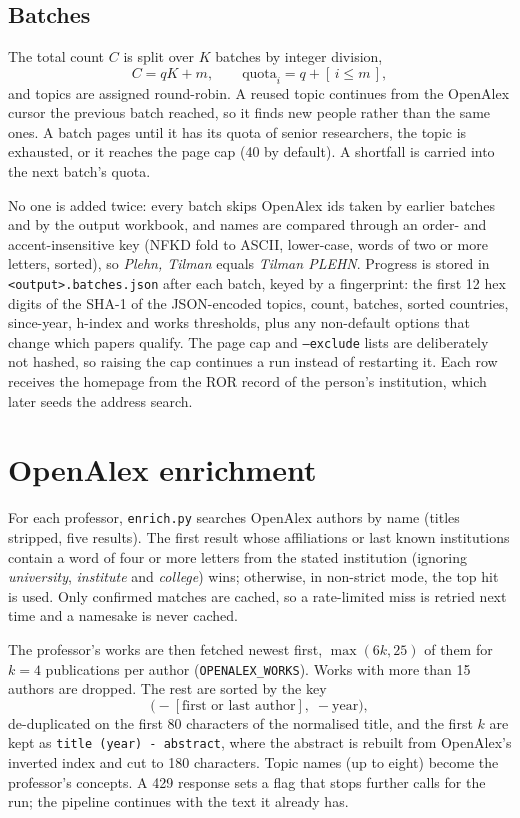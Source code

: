\documentclass[11pt,a4paper]{article}
\newcommand{\code}[1]{\texttt{#1}}
\begin{document}
\subsection{Batches}\label{sec:batches}
The total count $C$ is split over $K$ batches by integer division,
\[
  C = qK + m, \qquad \text{quota}_i = q + [\,i \le m\,] ,
\]
and topics are assigned round-robin. A reused topic continues from the OpenAlex cursor the
previous batch reached, so it finds new people rather than the same ones. A batch pages until it
has its quota of senior researchers, the topic is exhausted, or it reaches the page cap (40 by
default). A shortfall is carried into the next batch's quota.

No one is added twice: every batch skips OpenAlex ids taken by earlier batches and by the output
workbook, and names are compared through an order- and accent-insensitive key (NFKD fold to
ASCII, lower-case, words of two or more letters, sorted), so \emph{Plehn, Tilman} equals
\emph{Tilman PLEHN}. Progress is stored in \code{<output>.batches.json} after each batch, keyed by
a fingerprint: the first 12 hex digits of the SHA-1 of the JSON-encoded topics, count, batches,
sorted countries, since-year, h-index and works thresholds, plus any non-default options that
change which papers qualify. The page cap and \code{--exclude} lists are deliberately not
hashed, so raising the cap continues a run instead of restarting it. Each row receives the
homepage from the ROR record of the person's institution, which later seeds the address search.

\section{OpenAlex enrichment}

For each professor, \code{enrich.py} searches OpenAlex authors by name (titles stripped, five
results). The first result whose affiliations or last known institutions contain a word of four
or more letters from the stated institution (ignoring \emph{university}, \emph{institute} and
\emph{college}) wins; otherwise, in non-strict mode, the top hit is used. Only confirmed matches
are cached, so a rate-limited miss is retried next time and a namesake is never cached.

The professor's works are then fetched newest first, $\max(6k, 25)$ of them for $k = 4$
publications per author (\code{OPENALEX\_WORKS}). Works with more than 15 authors are dropped.
The rest are sorted by the key
\[
  \bigl(-[\text{first or last author}],\; -\text{year}\bigr),
\]
de-duplicated on the first 80 characters of the normalised title, and the first $k$ are kept
as \code{title (year) - abstract}, where the abstract is rebuilt from OpenAlex's inverted index
and cut to 180 characters. Topic names (up to eight) become the professor's concepts. A 429
response sets a flag that stops further calls for the run; the pipeline continues with the text
it already has.
\end{document}
